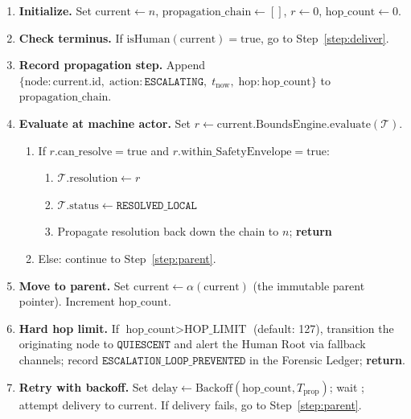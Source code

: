 \begin{algorithm}[H]
\caption{Bailout Protocol Escalation Algorithm (executed at every node)}
\label{alg:bailout-escalation}
\begin{enumerate}
\item \textbf{Initialize.} Set $\text{current} \leftarrow n$,
  $\text{propagation\_chain} \leftarrow []$, $r \leftarrow 0$,
  $\text{hop\_count} \leftarrow 0$.

\item \textbf{Check terminus.} If $\text{isHuman}(\text{current}) = \text{true}$,
  go to Step~\ref{step:deliver}.

\item \textbf{Record propagation step.} Append
  $\{\text{node}: \text{current.id},\; \text{action}: \texttt{ESCALATING},\;
  t_{\text{now}},\; \text{hop}: \text{hop\_count}\}$ to
  $\text{propagation\_chain}$.

\item \textbf{Evaluate at machine actor.} Set
  $r \leftarrow \text{current.BoundsEngine.evaluate}(\mathcal{T})$.
  \begin{enumerate}
  \item If $r.\text{can\_resolve} = \text{true}$ and
    $r.\text{within\_SafetyEnvelope} = \text{true}$:
    \begin{enumerate}
    \item $\mathcal{T}.\text{resolution} \leftarrow r$
    \item $\mathcal{T}.\text{status} \leftarrow \texttt{RESOLVED\_LOCAL}$
    \item Propagate resolution back down the chain to $n$; \textbf{return}
    \end{enumerate}
  \item Else: continue to Step~\ref{step:parent}.
  \end{enumerate}

\item \label{step:parent}\textbf{Move to parent.} Set $\text{current}
  \leftarrow \alpha(\text{current})$ (the immutable parent pointer).
  Increment $\text{hop\_count}$.

\item \textbf{Hard hop limit.} If $\text{hop\_count} > \text{HOP\_LIMIT}$
  (default: 127), transition the originating node to
  $\texttt{QUIESCENT}$ and alert the Human Root via fallback channels;
  record $\texttt{ESCALATION\_LOOP\_PREVENTED}$ in the Forensic Ledger;
  \textbf{return}.

\item \textbf{Retry with backoff.} Set $\text{delay} \leftarrow
  \text{Backoff}(\text{hop\_count}, T_{\text{prop}})$; wait ;
  attempt delivery to $\text{current}$. If delivery fails, go to
  Step~\ref{step:parent}.


\end{enumerate}
\end{algorithm}
